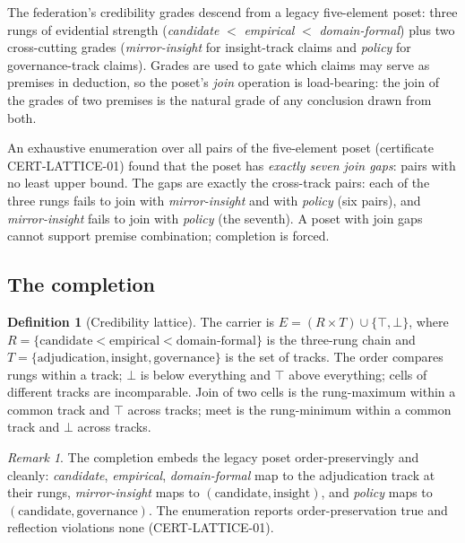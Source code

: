 \documentclass[11pt]{article}
\theoremstyle{definition}
\newtheorem{definition}[theorem]{Definition}
\theoremstyle{remark}
\newtheorem{remark}[theorem]{Remark}
\begin{document}
The federation's credibility grades descend from a legacy five-element poset:
three rungs of evidential strength
(\emph{candidate} $<$ \emph{empirical} $<$ \emph{domain-formal}) plus two
cross-cutting grades (\emph{mirror-insight} for insight-track claims and
\emph{policy} for governance-track claims). Grades are used to gate which
claims may serve as premises in deduction, so the poset's \emph{join}
operation is load-bearing: the join of the grades of two premises is the
natural grade of any conclusion drawn from both.

An exhaustive enumeration over all pairs of the five-element poset
(certificate CERT-LATTICE-01) found that the poset has \emph{exactly seven
join gaps}: pairs with no least upper bound. The gaps are exactly the
cross-track pairs: each of the three rungs fails to join with
\emph{mirror-insight} and with \emph{policy} (six pairs), and
\emph{mirror-insight} fails to join with \emph{policy} (the seventh). A poset
with join gaps cannot support premise combination; completion is forced.

\subsection{The completion}

\begin{definition}[Credibility lattice]\label{def:lattice}
The carrier is $E = (R \times T) \cup \{\top, \bot\}$, where
$R = \{\text{candidate} < \text{empirical} < \text{domain-formal}\}$ is the
three-rung chain and
$T = \{\text{adjudication}, \text{insight}, \text{governance}\}$ is the set of
tracks. The order compares rungs within a track; $\bot$ is below everything
and $\top$ above everything; cells of different tracks are incomparable.
Join of two cells is the rung-maximum within a common track and $\top$
across tracks; meet is the rung-minimum within a common track and $\bot$
across tracks.
\end{definition}

\begin{remark}
The completion embeds the legacy poset order-preservingly and cleanly:
\emph{candidate}, \emph{empirical}, \emph{domain-formal} map to the
adjudication track at their rungs, \emph{mirror-insight} maps to
$(\text{candidate}, \text{insight})$, and \emph{policy} maps to
$(\text{candidate}, \text{governance})$. The enumeration reports
order-preservation true and reflection violations none (CERT-LATTICE-01).
\end{remark}
\end{document}
